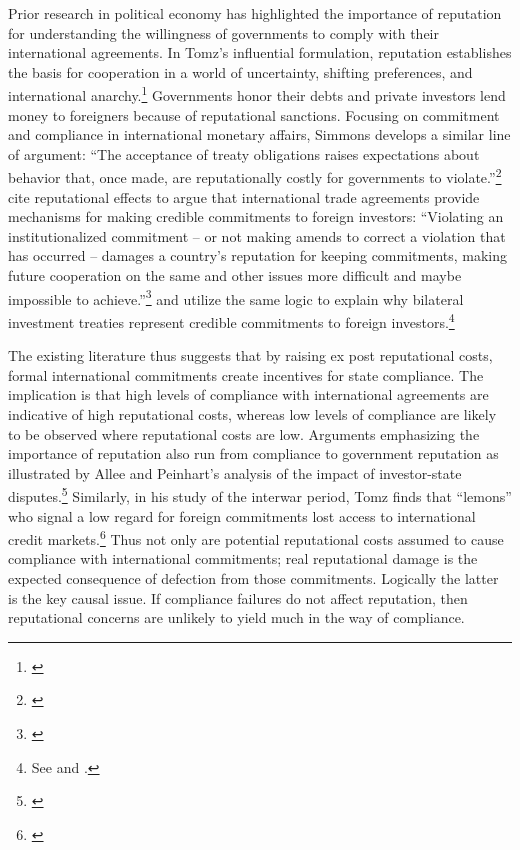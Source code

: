 \documentclass[12pt,onesided]{amsart}
\begin{document}
Prior research in political economy has highlighted the importance of reputation for understanding the willingness of governments to comply with their international agreements. In Tomz's influential formulation, reputation establishes the basis for cooperation in a world of uncertainty, shifting preferences, and international anarchy.\footnote{\citet{tomz:2007}} Governments honor their debts and private investors lend money to foreigners because of reputational sanctions. Focusing on commitment and compliance in international monetary affairs, Simmons develops a similar line of argument: ``The acceptance of treaty obligations raises expectations about behavior that, once made, are reputationally costly for governments to violate.''\footnote{\citet[p. 819]{simmons:2000}} \citeauthor{buthe:milner:2008} cite reputational effects to argue that international trade agreements provide mechanisms for making credible commitments to foreign investors: ``Violating an institutionalized commitment -- or not making amends to correct a violation that has occurred -- damages a country's reputation for keeping commitments, making future cooperation on the same and other issues more difficult and maybe impossible to achieve.''\footnote{\citet[p. 746]{buthe:milner:2008}}  \citeauthor{buthe:milner:2009} and \citeauthor{elkins:etal:2006} utilize the same logic to explain why bilateral investment treaties represent credible commitments to foreign investors.\footnote{See \citet{buthe:milner:2009} and \citet{elkins:etal:2006}.}

The existing literature thus suggests that by raising ex post reputational costs, formal international commitments create incentives for state compliance. The implication is that high levels of compliance with international agreements are indicative of high reputational costs, whereas low levels of compliance are likely to be observed where reputational costs are low. Arguments emphasizing the importance of reputation also run from compliance to government reputation as illustrated by Allee and Peinhart's analysis of the impact of investor-state disputes.\footnote{\citet{allee:peinhardt:2011}} Similarly, in his study of the interwar period, Tomz finds that ``lemons'' who signal a low regard for foreign commitments lost access to international credit markets.\footnote{\citet[p. 86--94]{tomz:2007}} Thus not only are potential reputational costs assumed to cause compliance with international commitments; real reputational damage is the expected consequence of defection from those commitments. Logically the latter is the key causal issue. If compliance failures do not affect reputation, then reputational concerns are unlikely to yield much in the way of compliance.
\end{document}

